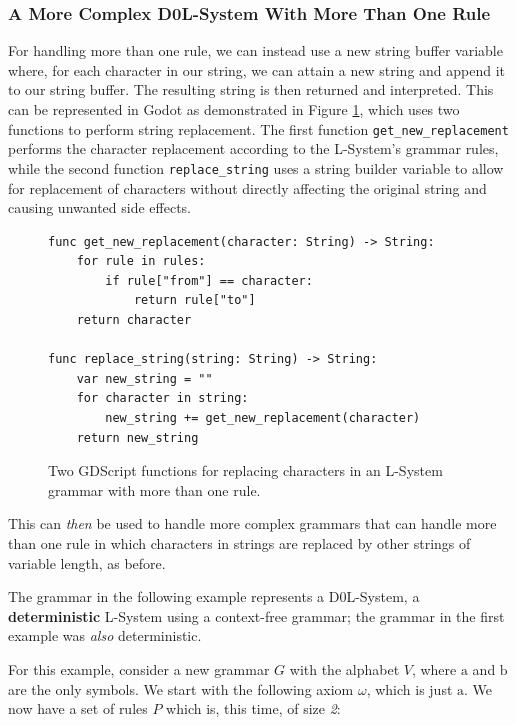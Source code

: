\subsubsection{A More Complex D0L-System With More Than One Rule}

For handling more than one rule, we can instead use a new string buffer variable where, for each character in our string, we can attain a new string and append it to our string buffer. The resulting string is then returned and interpreted. This can be represented in Godot as demonstrated in Figure \ref{fig:lsys-snippet-2}, which uses two functions to perform string replacement. The first function \verb|get_new_replacement| performs the character replacement according to the L-System's grammar rules, while the second function \verb|replace_string| uses a string builder variable to allow for replacement of characters without directly affecting the original string and causing unwanted side effects.

\begin{figure}[H]
    \centering
    \begin{lstlisting}
func get_new_replacement(character: String) -> String:
	for rule in rules:
		if rule["from"] == character:
			return rule["to"]
	return character

func replace_string(string: String) -> String:
	var new_string = ""
	for character in string:
		new_string += get_new_replacement(character)
	return new_string
    \end{lstlisting}
    \caption{Two GDScript functions for replacing characters in an L-System grammar with more than one rule.}
    \label{fig:lsys-snippet-2}
\end{figure}

This can \textit{then} be used to handle more complex grammars that can handle more than one rule in which characters in strings are replaced by other strings of variable length, as before.

The grammar in the following example represents a D0L-System\cite{lsystemintro}, a \textbf{deterministic} L-System using a context-free grammar; the grammar in the first example was \textit{also} deterministic.

\newcommand{\A}{\mbox{a}}
\newcommand{\B}{\mbox{b}}

For this example, consider a new grammar $G$ with the alphabet $V$, where $\A$ and $\B$ are the only symbols. We start with the following axiom $\omega$, which is just $\A$. We now have a set of rules $P$ which is, this time, of size \textit{2}:

